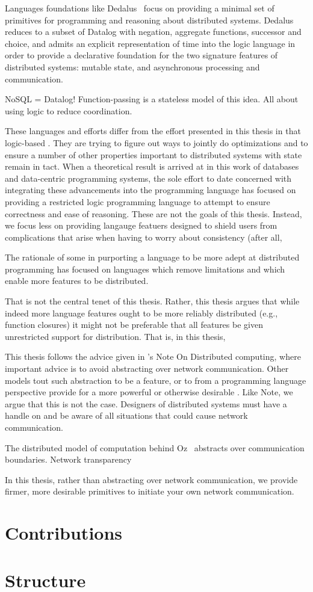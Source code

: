 Languages foundations like Dedalus~\cite{Dedalus} focus on providing a minimal set of
primitives for programming and reasoning about distributed systems. Dedalus
reduces to a subset of Datalog with negation, aggregate functions,
successor and choice, and admits an explicit representation of time into the
logic language in order to provide a declarative foundation for the two
signature features of distributed systems: mutable state, and asynchronous
processing and communication.

NoSQL = Datalog! Function-passing is a stateless model of this idea. All about
using logic to reduce coordination.

These languages and efforts differ from the effort presented in this thesis in
that logic-based . They are trying to figure out ways to jointly do
optimizations and to ensure a number of other properties important to
distributed systems with state remain in tact. When a theoretical result is
arrived at in this work of databases and data-centric programming systems, the
sole effort to date concerned with integrating these advancements into the
programming language has focused on providing a restricted logic programming
language to attempt to ensure correctness and ease of reasoning. These are not
the goals of this thesis. Instead, we focus less on providing langauge featuers designed to shield users from complications that arise when having to worry about consistency (after all,


The rationale of some in purporting a language to be more adept at distributed
programming has focused on languages which remove limitations and which enable
more features to be distributed.

That is not the central tenet of this thesis. Rather, this thesis argues that
while indeed more language features ought to be more reliably distributed (e.g.,
function closures) it might not be preferable that all features be given
unrestricted support for distribution. That is, in this thesis,

This thesis follows the advice given in 's Note On Distributed computing, where
important advice is to avoid abstracting over network communication. Other
models tout such abstraction to be a feature, or to from a programming language
perspective provide for a more powerful or otherwise desirable . Like Note, we
argue that this is not the case. Designers of distributed systems must have a
handle on and be aware of all situations that could cause network communication.

The distributed model of computation behind Oz~\cite{DistributedOz} abstracts
over communication boundaries. Network transparency
~\cite{ConceptsTechniquesModelsProgramming}

In this thesis, rather than abstracting over network communication, we provide
firmer, more desirable primitives to initiate your own network communication.




\section{Contributions}

\section{Structure}

\lipsum[1]
